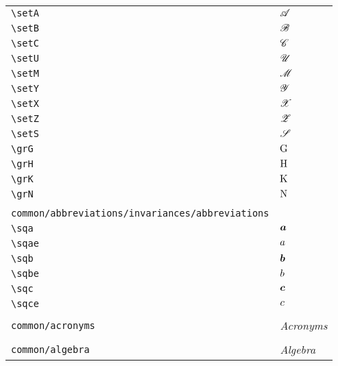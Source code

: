 \begin{longtable}{lll}
 \hline
{\color[rgb]{0.5,0.5,0.5}\texttt{\textbackslash setA}} & $\mathscr{A}$ & \\ 
 {\color[rgb]{0.5,0.5,0.5}\texttt{\textbackslash setB}} & $\mathscr{B}$ & \\ 
 {\color[rgb]{0.5,0.5,0.5}\texttt{\textbackslash setC}} & $\mathscr{C}$ & \\ 
 {\color[rgb]{0.5,0.5,0.5}\texttt{\textbackslash setU}} & $\mathscr{U}$ & \\ 
 {\color[rgb]{0.5,0.5,0.5}\texttt{\textbackslash setM}} & $\mathscr{M}$ & \\ 
 {\color[rgb]{0.5,0.5,0.5}\texttt{\textbackslash setY}} & $\mathscr{Y}$ & \\ 
 {\color[rgb]{0.5,0.5,0.5}\texttt{\textbackslash setX}} & $\mathscr{X}$ & \\ 
 {\color[rgb]{0.5,0.5,0.5}\texttt{\textbackslash setZ}} & $\mathscr{Z}$ & \\ 
 {\color[rgb]{0.5,0.5,0.5}\texttt{\textbackslash setS}} & $\mathscr{S}$ & \\ 
 {\color[rgb]{0.5,0.5,0.5}\texttt{\textbackslash grG}} & $\mathrm{G}$ & \\ 
 {\color[rgb]{0.5,0.5,0.5}\texttt{\textbackslash grH}} & $\mathrm{H}$ & \\ 
 {\color[rgb]{0.5,0.5,0.5}\texttt{\textbackslash grK}} & $\mathrm{K}$ & \\ 
 {\color[rgb]{0.5,0.5,0.5}\texttt{\textbackslash grN}} & $\mathrm{N}$ & \\ 
  &  & \\ 
 {\color[rgb]{0.5,0.5,0.5}\texttt{common/abbreviations/invariances/abbreviations}} & \multicolumn{2}{l}{\emph{}}\\ 
 \hline
{\color[rgb]{0.5,0.5,0.5}\texttt{\textbackslash sqa}} & $\boldsymbol{a}$ & \\ 
 {\color[rgb]{0.5,0.5,0.5}\texttt{\textbackslash sqae}} & $a$ & \\ 
 {\color[rgb]{0.5,0.5,0.5}\texttt{\textbackslash sqb}} & $\boldsymbol{b}$ & \\ 
 {\color[rgb]{0.5,0.5,0.5}\texttt{\textbackslash sqbe}} & $b$ & \\ 
 {\color[rgb]{0.5,0.5,0.5}\texttt{\textbackslash sqc}} & $\boldsymbol{c}$ & \\ 
 {\color[rgb]{0.5,0.5,0.5}\texttt{\textbackslash sqce}} & $c$ & \\ 
  &  & \\ 
 {\color[rgb]{0.5,0.5,0.5}\texttt{common/acronyms}} & \multicolumn{2}{l}{\emph{Acronyms}}\\ 
 \hline
 &  & \\ 
 {\color[rgb]{0.5,0.5,0.5}\texttt{common/algebra}} & \multicolumn{2}{l}{\emph{Algebra}}\\ 

\end{longtable}

